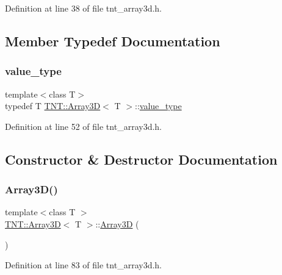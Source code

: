 Definition at line 38 of file tnt\+\_\+array3d.\+h.



\subsection{Member Typedef Documentation}
\mbox{\label{classTNT_1_1Array3D_a51945370abf416e829e6a50bdb0af6d5}} 
\subsubsection{\texorpdfstring{value\+\_\+type}{value\_type}}
{\footnotesize\ttfamily template$<$class T$>$ \\
typedef T \hyperlink{classTNT_1_1Array3D}{T\+N\+T\+::\+Array3D}$<$ T $>$\+::\hyperlink{classTNT_1_1Array3D_a51945370abf416e829e6a50bdb0af6d5}{value\+\_\+type}}



Definition at line 52 of file tnt\+\_\+array3d.\+h.



\subsection{Constructor \& Destructor Documentation}
\mbox{\label{classTNT_1_1Array3D_a94ceeeadc5904e9ec4069ef61394ff8e}} 
\subsubsection{\texorpdfstring{Array3\+D()}{Array3D()}\hspace{0.1cm}{\footnotesize\ttfamily [1/5]}}
{\footnotesize\ttfamily template$<$class T $>$ \\
\hyperlink{classTNT_1_1Array3D}{T\+N\+T\+::\+Array3D}$<$ T $>$\+::\hyperlink{classTNT_1_1Array3D}{Array3D} (\begin{DoxyParamCaption}{ }\end{DoxyParamCaption})}



Definition at line 83 of file tnt\+\_\+array3d.\+h.

